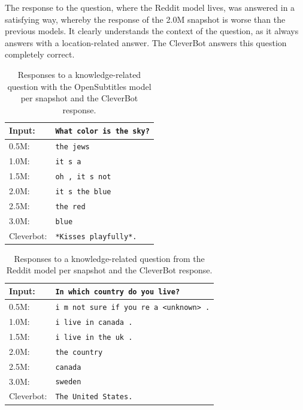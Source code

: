 The response to the question, where the Reddit model lives, was answered in a satisfying way, whereby the response of the 2.0M snapshot is worse than the previous models. It clearly understands the context of the question, as it always answers with a location-related answer. The CleverBot answers this question completely correct.

\begin{table}[H]
	\centering
	\begin{adjustbox}{max width=\textwidth}
		\begin{tabularx}{\textwidth}{lX}
			\toprule
			Input: 	& \texttt{What color is the sky?}\\
			\midrule
			0.5M: 	& \texttt{the jews}\\
			1.0M: 	& \texttt{it s a}\\
			1.5M:	& \texttt{oh , it s not}\\
			2.0M:	& \texttt{it s the blue}\\
			2.5M:	& \texttt{the red}\\
			3.0M:	& \texttt{blue}\\
			Cleverbot:&\texttt{*Kisses playfully*.}\\
			\bottomrule
		\end{tabularx}
	\end{adjustbox}
	\caption{Responses to a knowledge-related question with the OpenSubtitles model per snapshot and the CleverBot response.}
	\label{results:example3_output:OpenSubtitle_compared}
\end{table}
\begin{table}[H]
	\centering
	\begin{adjustbox}{max width=\textwidth}
		\begin{tabularx}{\textwidth}{lX}
			\toprule
			Input: 	& \texttt{In which country do you live?}\\
			\midrule
			0.5M: 	& \texttt{i m not sure if you re a <unknown> .}\\
			1.0M: 	& \texttt{i live in canada .}\\
			1.5M:	& \texttt{i live in the uk .}\\
			2.0M:	& \texttt{the country}\\
			2.5M:	& \texttt{canada}\\
			3.0M:	& \texttt{sweden}\\
			Cleverbot:&\texttt{The United States.}\\
			\bottomrule
		\end{tabularx}
	\end{adjustbox}
	\caption{Responses to a knowledge-related question from the Reddit model per snapshot and the CleverBot response.}
	\label{results:example3_output:Reddit_compared}
\end{table}

